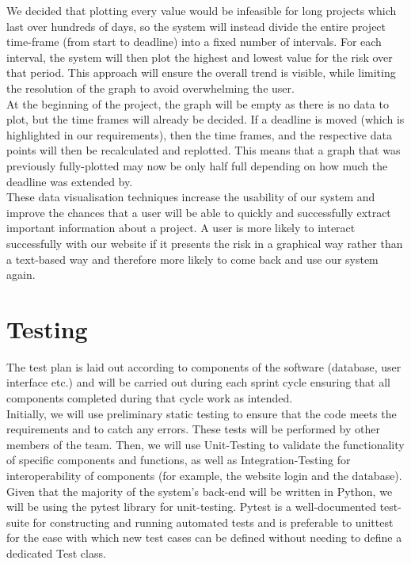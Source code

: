 \documentclass[a4paper]{article}
\theoremstyle{plain}
\theoremstyle{definition}
\theoremstyle{remark}
\begin{document}
\noindent We decided that plotting every value would be infeasible for long projects which last over hundreds of days, so the system will instead divide the entire project time-frame (from start to deadline) into a fixed number of intervals. For each interval, the system will then plot the highest and lowest value for the risk over that period. This approach will ensure the overall trend is visible, while limiting the resolution of the graph to avoid overwhelming the user.\\

\noindent At the beginning of the project, the graph will be empty as there is no data to plot, but the time frames will already be decided. If a deadline is moved (which is highlighted  in our requirements), then the time frames, and the respective data points will then be recalculated and replotted. This means that a graph that was previously fully-plotted may now be only half full depending on how much the deadline was extended by. \\

\noindent These data visualisation techniques increase the usability of our system and improve the chances that a user will be able to quickly and successfully extract important information about a project. A user is more likely to interact successfully with our website if it presents the risk in a graphical way rather than a text-based way and therefore more likely to come back and use our system again. 

\section*{Testing}
The test plan is laid out according to components of the software (database, user interface etc.) and will be carried out during each sprint cycle ensuring that all components completed during that cycle work as intended.\\

\noindent Initially, we will use preliminary static testing to ensure that the code meets the requirements and to catch any errors. These tests will be performed by other members of the team. Then, we will use Unit-Testing to validate the functionality of specific components and functions, as well as Integration-Testing for interoperability of components (for example, the website login and the database). Given that the majority of the system’s back-end will be written in Python, we will be using the pytest library for unit-testing. Pytest is a well-documented \cite{krekel_2023} test-suite for constructing and running automated tests and is preferable to unittest for the ease with which new test cases can be defined without needing to define a dedicated Test class.
\end{document}
